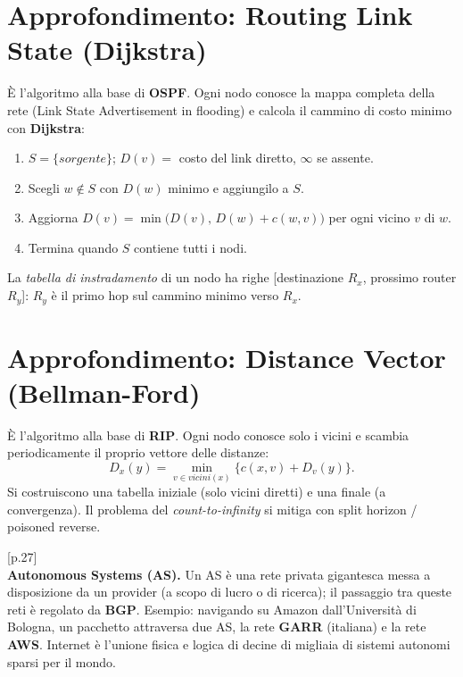 \documentclass[11pt,a4paper]{report}
\begin{document}
\section{Approfondimento: Routing Link State (Dijkstra)}
È l'algoritmo alla base di \textbf{OSPF}. Ogni nodo conosce la mappa completa della rete (Link State Advertisement in flooding) e calcola il cammino di costo minimo con \textbf{Dijkstra}:
\begin{enumerate}[noitemsep]
\item $S=\{sorgente\}$; $D(v)=$ costo del link diretto, $\infty$ se assente.
\item Scegli $w\notin S$ con $D(w)$ minimo e aggiungilo a $S$.
\item Aggiorna $D(v)=\min\big(D(v),\,D(w)+c(w,v)\big)$ per ogni vicino $v$ di $w$.
\item Termina quando $S$ contiene tutti i nodi.
\end{enumerate}
La \emph{tabella di instradamento} di un nodo ha righe [destinazione $R_x$, prossimo router $R_y$]: $R_y$ è il primo hop sul cammino minimo verso $R_x$.

\section{Approfondimento: Distance Vector (Bellman-Ford)}
È l'algoritmo alla base di \textbf{RIP}. Ogni nodo conosce solo i vicini e scambia periodicamente il proprio vettore delle distanze:
\[ D_x(y) = \min_{v\in vicini(x)}\big\{ c(x,v) + D_v(y) \big\}. \]
Si costruiscono una tabella iniziale (solo vicini diretti) e una finale (a convergenza). Il problema del \emph{count-to-infinity} si mitiga con split horizon / poisoned reverse.


\noindent\hfill{\footnotesize\color{gray}[p.27]}\\
\textbf{Autonomous Systems (AS).} Un AS è una rete privata gigantesca messa a disposizione da un provider (a scopo di lucro o di ricerca); il passaggio tra queste reti è regolato da \textbf{BGP}. Esempio: navigando su Amazon dall'Università di Bologna, un pacchetto attraversa due AS, la rete \textbf{GARR} (italiana) e la rete \textbf{AWS}. Internet è l'unione fisica e logica di decine di migliaia di sistemi autonomi sparsi per il mondo.
\end{document}
